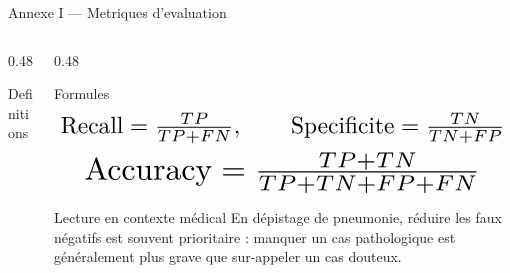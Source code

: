 \begin{frame}{Annexe I — Metriques d'evaluation}
\small
\begin{columns}[T,onlytextwidth]
\begin{column}{0.48\textwidth}
\begin{block}{Definitions}
\end{block}
\end{column}
\begin{column}{0.48\textwidth}
\begin{block}{Formules}
\[
\resizebox{0.92\linewidth}{!}{$\mathrm{Recall}=\frac{TP}{TP+FN},\qquad
\mathrm{Specificite}=\frac{TN}{TN+FP}$}
\]
\[
\resizebox{0.82\linewidth}{!}{$\mathrm{Accuracy}=\frac{TP+TN}{TP+TN+FP+FN}$}
\]
\end{block}
\begin{block}{Lecture en contexte médical}
En dépistage de pneumonie, réduire les faux négatifs est souvent prioritaire : manquer un cas pathologique est généralement plus grave que sur-appeler un cas douteux.
\end{block}
\end{column}
\end{columns}
\end{frame}


